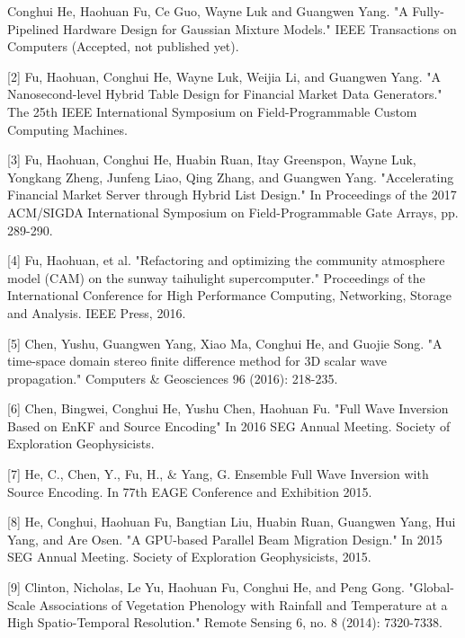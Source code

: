 \documentclass[11pt, a4paper]{awesome-cv}
\begin{document}
\begin{cvparagraph}
[1] Conghui He, Haohuan Fu, Ce Guo, Wayne Luk and Guangwen Yang. "A Fully-Pipelined Hardware Design for Gaussian Mixture Models." IEEE Transactions on Computers (Accepted, not published yet).

[2] Fu, Haohuan, Conghui He, Wayne Luk, Weijia Li, and Guangwen Yang. "A Nanosecond-level Hybrid Table Design for Financial Market Data Generators." The 25th IEEE International Symposium on Field-Programmable Custom Computing Machines.

[3] Fu, Haohuan, Conghui He, Huabin Ruan, Itay Greenspon, Wayne Luk, Yongkang Zheng, Junfeng Liao, Qing Zhang, and Guangwen Yang. "Accelerating Financial Market Server through Hybrid List Design." In Proceedings of the 2017 ACM/SIGDA International Symposium on Field-Programmable Gate Arrays, pp. 289-290. 

[4] Fu, Haohuan, et al. "Refactoring and optimizing the community atmosphere model (CAM) on the sunway taihulight supercomputer." Proceedings of the International Conference for High Performance Computing, Networking, Storage and Analysis. IEEE Press, 2016.

[5] Chen, Yushu, Guangwen Yang, Xiao Ma, Conghui He, and Guojie Song. "A time-space domain stereo finite difference method for 3D scalar wave propagation." Computers \& Geosciences 96 (2016): 218-235.

[6] Chen, Bingwei, Conghui He, Yushu Chen, Haohuan Fu. "Full Wave Inversion Based on EnKF and Source Encoding" In 2016 SEG Annual Meeting. Society of Exploration Geophysicists.

[7] He, C., Chen, Y., Fu, H., \& Yang, G. Ensemble Full Wave Inversion with Source Encoding. In 77th EAGE Conference and Exhibition 2015.

[8] He, Conghui, Haohuan Fu, Bangtian Liu, Huabin Ruan, Guangwen Yang, Hui Yang, and Are Osen. "A GPU-based Parallel Beam Migration Design." In 2015 SEG Annual Meeting. Society of Exploration Geophysicists, 2015.

[9] Clinton, Nicholas, Le Yu, Haohuan Fu, Conghui He, and Peng Gong. "Global-Scale Associations of Vegetation Phenology with Rainfall and Temperature at a High Spatio-Temporal Resolution." Remote Sensing 6, no. 8 (2014): 7320-7338.
\end{cvparagraph}


\end{document}

